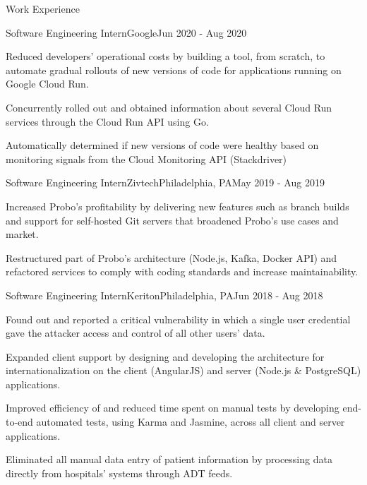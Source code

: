 \documentclass{resume} %
\begin{document}
\begin{rSection}{Work Experience}

\begin{rSubsection}{Software Engineering Intern}{Google}{}{Jun 2020 - Aug 2020}
\item Reduced developers' operational costs by building a tool, from scratch, to automate gradual rollouts of new versions of code for applications running on Google Cloud Run.
\item Concurrently rolled out and obtained information about several Cloud Run services through the Cloud Run API using Go.
\item Automatically determined if new versions of code were healthy based on monitoring signals from the Cloud Monitoring API (Stackdriver)
\end{rSubsection}


\begin{rSubsection}{Software Engineering Intern}{Zivtech}{Philadelphia, PA}{May 2019 - Aug 2019}
\item Increased Probo's profitability by delivering new features such as branch builds and support for self-hosted Git servers that broadened Probo's use cases and market.
\item Restructured part of Probo's architecture (Node.js, Kafka, Docker API) and refactored services to comply with coding standards and increase maintainability.
\end{rSubsection}


\begin{rSubsection}{Software Engineering Intern}{Keriton}{Philadelphia, PA}{Jun 2018 - Aug 2018}
\item Found out and reported a critical vulnerability in which a single user credential gave the attacker access and control of all other users' data.
\item Expanded client support by designing and developing the architecture for internationalization on the client (AngularJS) and server (Node.js \& PostgreSQL) applications.
\item Improved efficiency of and reduced time spent on manual tests by developing end-to-end automated tests, using Karma and Jasmine, across all client and server applications.
\item Eliminated all manual data entry of patient information by processing data directly from hospitals' systems through ADT feeds.
\end{rSubsection}

\end{rSection}
\end{document}
